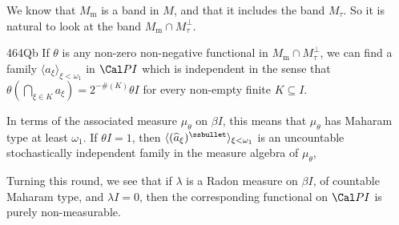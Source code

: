  We know that
$M_{\text{m}}$ is a band in $M$, and that it includes the band
$M_{\tau}$.   So it is natural to look at the band
$M_{\text{m}}\cap M_{\tau}^{\perp}$.

\spheader 464Qb If $\theta$ is any non-zero non-negative
functional in $M_{\text{m}}\cap M_{\tau}^{\perp}$, we can find a family
$\langle a_{\xi}\rangle_{\xi<\omega_1}$ in $\Cal PI$ which is
independent in the sense that $\theta(\bigcap_{\xi\in K}a_{\xi})
=2^{-\#(K)}\theta I$ for every non-empty finite $K\subseteq I$.

In terms of the associated measure $\mu_{\theta}$ on $\beta I$, this
means that $\mu_{\theta}$ has Maharam type at least 
$\omega_1$.
If $\theta I=1$, then
$\langle(\widehat{a}_{\xi})^{\ssbullet}\rangle_{\xi<\omega_1}$ is an
uncountable stochastically
independent family in the measure algebra of 
$\mu_{\theta}$,

Turning this round, we see that if $\lambda$ is a Radon measure on
$\beta I$, of countable Maharam type, and $\lambda I=0$, then the
corresponding functional on $\Cal PI$ is purely non-measurable.


